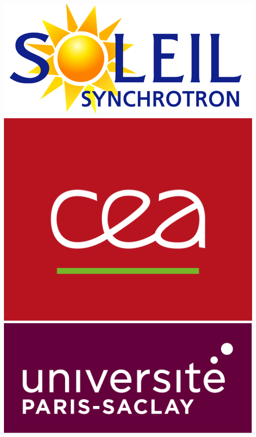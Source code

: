 \begin{titlepage}
\includegraphics[scale=0.2]{Images/SOLEILLogo.png}
\hspace{2.7cm}
\includegraphics[scale=0.0472]{Images/LogoCEA.png}
\hspace{2.7cm}
\includegraphics[scale=0.2]{Images/LogoParisSaclay.jpg}

\vspace{1.1cm}
    \begin{center}
        \vspace*{1cm}
        

\end{center}
\end{titlepage}
